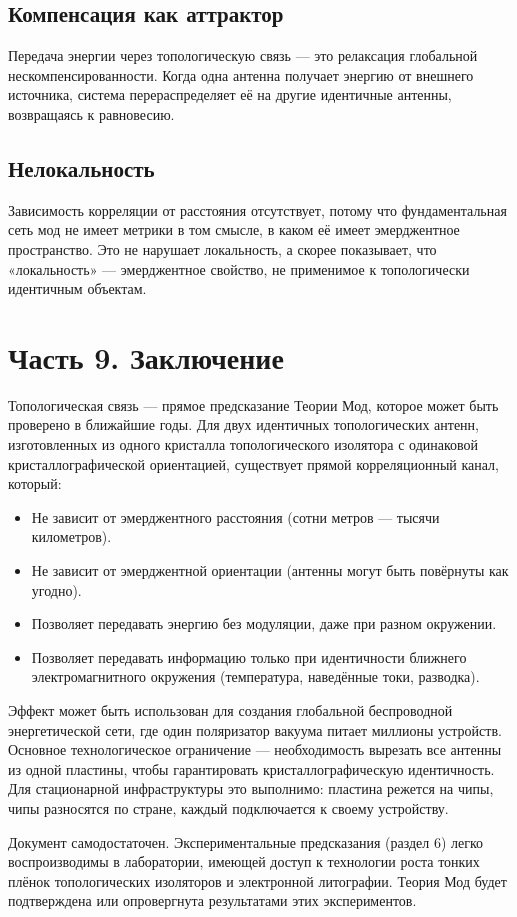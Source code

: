 \documentclass[a4paper,12pt]{article}
\begin{document}
\subsection{Компенсация как аттрактор}
Передача энергии через топологическую связь — это релаксация глобальной нескомпенсированности. Когда одна антенна получает энергию от внешнего источника, система перераспределяет её на другие идентичные антенны, возвращаясь к равновесию.

\subsection{Нелокальность}
Зависимость корреляции от расстояния отсутствует, потому что фундаментальная сеть мод не имеет метрики в том смысле, в каком её имеет эмерджентное пространство. Это не нарушает локальность, а скорее показывает, что «локальность» — эмерджентное свойство, не применимое к топологически идентичным объектам.

\section*{Часть 9. Заключение}

Топологическая связь — прямое предсказание Теории Мод, которое может быть проверено в ближайшие годы. Для двух идентичных топологических антенн, изготовленных из одного кристалла топологического изолятора с одинаковой кристаллографической ориентацией, существует прямой корреляционный канал, который:
\begin{itemize}
    \item Не зависит от эмерджентного расстояния (сотни метров — тысячи километров).
    \item Не зависит от эмерджентной ориентации (антенны могут быть повёрнуты как угодно).
    \item Позволяет передавать энергию без модуляции, даже при разном окружении.
    \item Позволяет передавать информацию только при идентичности ближнего электромагнитного окружения (температура, наведённые токи, разводка).
\end{itemize}

Эффект может быть использован для создания глобальной беспроводной энергетической сети, где один поляризатор вакуума питает миллионы устройств. Основное технологическое ограничение — необходимость вырезать все антенны из одной пластины, чтобы гарантировать кристаллографическую идентичность. Для стационарной инфраструктуры это выполнимо: пластина режется на чипы, чипы разносятся по стране, каждый подключается к своему устройству.

Документ самодостаточен. Экспериментальные предсказания (раздел 6) легко воспроизводимы в лаборатории, имеющей доступ к технологии роста тонких плёнок топологических изоляторов и электронной литографии. Теория Мод будет подтверждена или опровергнута результатами этих экспериментов.
\end{document}
